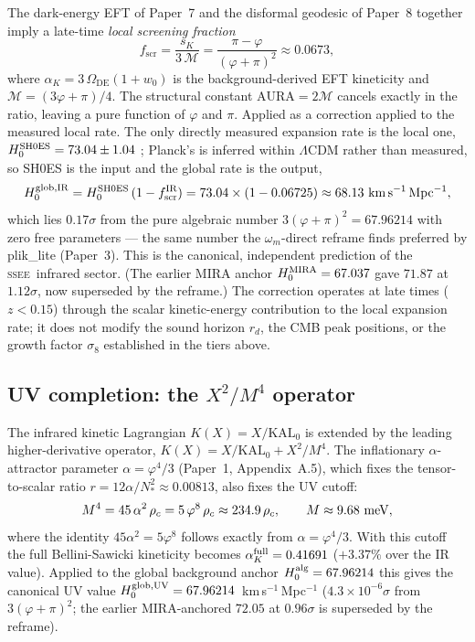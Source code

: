 \documentclass[12pt,a4paper]{article}
\newcommand{\SSEE}{\textsc{ssee}}
\newcommand{\phiG}{\varphi}
\newcommand{\KAL}{\mathrm{KAL}_0}
\newcommand{\MIRA}{\mathcal{M}}
\newcommand{\AURA}{\mathrm{AURA}}
\newcommand{\fscr}{f_{\mathrm{scr}}}
\newcommand{\Omde}{\Omega_{\mathrm{DE}}}
\newcommand{\wz}{w_0}
\newcommand{\alphaK}{\alpha_K}
\begin{document}
The dark-energy EFT of Paper~7 and the disformal geodesic of Paper~8 together
imply a late-time \emph{local screening fraction}
\begin{equation}
\fscr = \frac{s_K}{3\,\MIRA}
      = \frac{\pi-\phiG}{(\phiG+\pi)^2}
      \approx 0.0673 ,
\end{equation}
where $\alphaK = 3\,\Omde(1+\wz)$ is the background-derived EFT kineticity and
$\MIRA = (3\phiG+\pi)/4$. The structural constant $\AURA = 2\MIRA$ cancels
exactly in the ratio, leaving a pure function of $\phiG$ and $\pi$. Applied as a
correction applied to the measured local rate. The only directly measured
expansion rate is the local one, $H_0^{\rm SH0ES}=73.04\pm1.04$
\citep{Riess2022}; Planck's is inferred within $\Lambda$CDM rather than
measured, so SH0ES is the input and the global rate is the output,
\begin{equation}
H_0^{\rm glob,IR} = H_0^{\rm SH0ES}\,(1-\fscr^{\rm IR})
                = 73.04\times(1-0.06725)
                \approx 68.13~{\rm km\,s^{-1}\,Mpc^{-1}} ,
\end{equation}
which lies $0.17\sigma$ from the pure algebraic number
$3(\phiG+\pi)^2=67.96214$ with zero free parameters --- the same number the
$\omega_m$-direct reframe finds preferred by plik\_lite (Paper~3). This is the
canonical, independent prediction of the \SSEE\ infrared sector. (The earlier MIRA anchor
$H_0^{\rm MIRA}=67.037$ gave $71.87$ at $1.12\sigma$, now superseded by the
reframe.) The correction operates at late times
($z<0.15$) through the scalar kinetic-energy contribution to the local expansion
rate; it does not modify the sound horizon $r_d$, the CMB peak positions, or the
growth factor $\sigma_8$ established in the tiers above.

\subsection{UV completion: the \texorpdfstring{$X^2/M^4$}{X2/M4} operator}
\label{sec:ext-uv}

The infrared kinetic Lagrangian $K(X)=X/\KAL$ is extended by the leading
higher-derivative operator, $K(X)=X/\KAL + X^2/M^4$. The inflationary
$\alpha$-attractor parameter $\alpha=\phiG^4/3$ (Paper~1, Appendix~A.5), which
fixes the tensor-to-scalar ratio $r=12\alpha/N_*^2\approx0.00813$, also fixes the
UV cutoff:
\begin{equation}
M^4 = 45\,\alpha^2\,\rho_c = 5\,\phiG^8\,\rho_c \approx 234.9\,\rho_c ,
\qquad M \approx 9.68~{\rm meV} ,
\end{equation}
where the identity $45\alpha^2 = 5\phiG^8$ follows exactly from
$\alpha=\phiG^4/3$. With this cutoff the full Bellini-Sawicki kineticity becomes
$\alphaK^{\rm full}=0.41691$ ($+3.37\%$ over the IR value). Applied to the
global background anchor $H_0^{\rm alg}=67.96214$ this gives the canonical UV value
$H_0^{\rm glob,UV}=67.96214$~km\,s$^{-1}$\,Mpc$^{-1}$ ($4.3{\times}10^{-6}\sigma$ from $3(\varphi+\pi)^2$;
the earlier MIRA-anchored $72.05$ at $0.96\sigma$ is superseded by the reframe).
\end{document}
